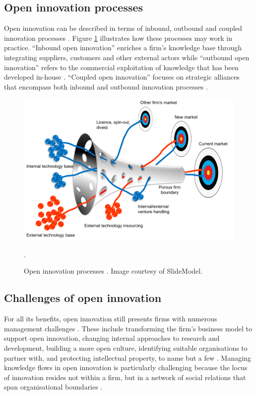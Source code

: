 \subsection{Open innovation processes}

Open innovation can be described in terms of inbound, outbound and coupled innovation processes \citep{chesbrough2006beyond,enkel2009open,gassmann2010future}. Figure \ref{fig:oi_process} illustrates how these processes may work in practice. \enquote{Inbound open innovation} enriches a firm’s knowledge base through integrating suppliers, customers and other external actors \citep{xu2013inbound} while \enquote{outbound open innovation} refers to the commercial exploitation of knowledge that has been developed in-house \citep{de2016knowledge}. \enquote{Coupled open innovation} focuses on strategic alliances that encompass both inbound and outbound innovation processes \citep{spithoven2013open}. \medskip

\begin{figure}
	\centering
	\includegraphics[width=0.9\linewidth]{Images/oi_process}
	\caption{Open innovation processes \citep{chesbrough2004open}. Image courtesy of SlideModel.}.
	\label{fig:oi_process}
\end{figure}

\subsection{Challenges of open innovation}

For all its benefits, open innovation still presents firms with numerous management challenges \citep{hossain2013open,vanhaverbeke2014surfing}. These include transforming the firm's business model to support open innovation, changing internal approaches to research and development, building a more open culture, identifying suitable organisations to partner with, and protecting intellectual property, to name but a few \citep{dahlander2010open,sieg2010managerial,lichtenthaler2011your,durst2013success,roper2013externalities,aloini2016structured}. Managing knowledge flows in open innovation is particularly challenging because the locus of innovation resides not within a firm, but in a network of social relations that span organisational boundaries \citep{powell1996interorganizational,elmquist2009exploring}. 

